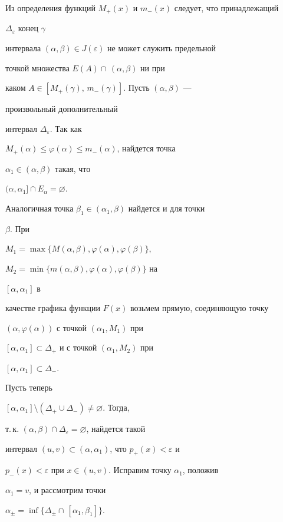 Из определения функций $M_+(x)$ и $m_-(x)$ следует, что принадлежащий


$\Delta_\varepsilon$ конец $\gamma$


интервала $(\alpha,\beta)\in J(\varepsilon)$ не может служить предельной


точкой множества $E(A)\cap\,(\alpha,\beta)$ ни при


каком $A\in[M_+(\gamma),\,m_-(\gamma)]$. Пусть $(\alpha,\beta)$ ---


произвольный дополнительный


интервал $\Delta_\varepsilon$. Так как


$M_+(\alpha)\le\varphi(\alpha)\le m_-(\alpha)$, найдется точка


$\alpha_1\in(\alpha,\beta)$ такая, что


$(\alpha,\alpha_1]\cap E_\alpha=\varnothing$.





Аналогичная точка $\beta_1\in(\alpha_1,\beta)$ найдется и для точки


$\beta$. При


$M_1=\max\{M(\alpha,\beta),\varphi(\alpha),\varphi(\beta)\}$,


$M_2=\min\{m(\alpha,\beta),\varphi(\alpha),\varphi(\beta)\}$ на


$[\alpha,\alpha_1]$ в


качестве графика функции $F(x)$ возьмем прямую, соединяющую точку


$(\alpha,\varphi(\alpha))$ с точкой $(\alpha_1,M_1)$ при


$[\alpha,\alpha_1]\subset\Delta_+$ и с точкой $(\alpha_1,M_2)$ при


$[\alpha,\alpha_1]\subset\Delta_-$.





Пусть теперь


$[\alpha,\alpha_1]\setminus(\Delta_+\cup\Delta_-)\ne\varnothing$. Тогда,


т.\,к. $(\alpha,\beta)\cap\Delta_\varepsilon=\varnothing$, найдется такой


интервал $(u,v)\subset(\alpha,\alpha_1)$, что $p_+(x)<\varepsilon$ и


$p_-(x)<\varepsilon$ при $x\in(u,v)$. Исправим точку $\alpha_1$, положив


$\alpha_1=v$, и рассмотрим точки


$\alpha_\pm=\inf\{\Delta_\pm\cap\,[\alpha_1,\beta_1]\}$.


